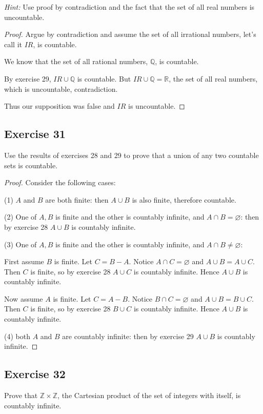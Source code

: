 \documentclass[14pt]{extarticle}
\newcommand{\es}{\varnothing}
\newcommand{\R}{\mathbb{R}}
\newcommand{\Q}{\mathbb{Q}}
\newcommand{\Z}{\mathbb{Z}}
\begin{document}
    {\it Hint:} Use proof by contradiction and the fact that the set of all real numbers is uncountable.

\begin{proof}
    Argue by contradiction and assume the set of all irrational numbers, let's call it $IR$, is countable.

    We know that the set of all rational numbers, $\Q$, is countable.

    By exercise 29, \(IR \cup \Q\) is countable. But \(IR \cup \Q = \R\), the set of all real numbers, which is
    uncountable, contradiction.

    Thus our supposition was false and $IR$ is uncountable.
\end{proof}

\subsection{Exercise 31}
Use the results of exercises 28 and 29 to prove that a union of any two countable sets is countable.

\begin{proof}
    Consider the following cases:

    (1) $A$ and $B$ are both finite: then \(A \cup B\) is also finite, therefore countable.

    (2) One of $A, B$ is finite and the other is countably infinite, and \(A \cap B = \es\): then by exercise 28
    \(A \cup B\) is countably infinite.

    (3) One of $A, B$ is finite and the other is countably infinite, and \(A \cap B \neq \es\):

    First assume $B$ is finite. Let \(C = B - A\). Notice \(A \cap C = \es\) and \(A \cup B = A \cup C\). Then $C$ is finite, so by exercise 28 \(A \cup C\) is countably infinite. Hence \(A \cup B\) is countably infinite.

    Now assume $A$ is finite. Let \(C = A - B\). Notice \(B \cap C = \es\) and \(A \cup B = B \cup C\). Then $C$ is finite, so by exercise 28 \(B \cup C\) is countably infinite. Hence \(A \cup B\) is countably infinite.

    (4) both $A$ and $B$ are countably infinite: then by exercise 29 \(A \cup B\) is countably infinite.
\end{proof}

\subsection{Exercise 32}
Prove that \(\Z \times \Z\), the Cartesian product of the set of integers with itself, is countably infinite.
\end{document}
